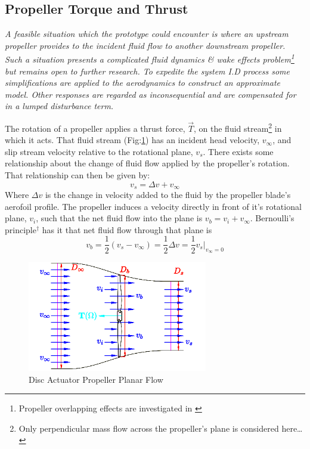 \subsection{Propeller Torque and Thrust}
\label{subsec:dynamics.aero.bem}
\emph{\color{Gray} A feasible situation which the prototype could encounter is where an upstream propeller provides to the incident fluid flow to another downstream propeller. Such a situation presents a complicated fluid dynamics \& wake effects problem\footnote{Propeller overlapping effects are investigated in \cite{configurationpropulsion}} but remains open to further research. To expedite the system I.D process some simplifications are applied to the aerodynamics to construct an approximate model. Other responses are regarded as inconsequential and are compensated for in a lumped disturbance term.}
\par
The rotation of a propeller applies a thrust force, $\vec{T}$, on the fluid stream\footnote{Only perpendicular mass flow across the propeller's plane is considered here\ldots} in which it acts. That fluid stream (Fig:\ref{fig:bem-flow}) has an incident head velocity, $v_\infty$, and slip stream velocity relative to the rotational plane, $v_s$. There exists some relationship about the change of fluid flow applied by the propeller's rotation. That relationship can then be given by:
\begin{equation}
v_ s = \Delta v + v_\infty
\end{equation}
Where $\Delta v$ is the change in velocity added to the fluid by the propeller blade's aerofoil profile. The propeller induces a velocity directly in front of it's rotational plane, $v_i$, such that the net fluid flow into the plane is $v_b=v_i+v_\infty$. Bernoulli's principle$^{\dagger}$ has it that net fluid flow through that plane is
\begin{equation}\label{eq:bernoulli}
v_b = \frac{1}{2} ( v_s - v_{\infty} ) = \frac{1}{2} \Delta v = \frac{1}{2} v_s \big|_{v_\infty=0}
\end{equation}
\begin{figure}[htbp]
\centering
\includegraphics[width=0.7\textwidth]{figs/bem-flow}
\caption{Disc Actuator Propeller Planar Flow}
\label{fig:bem-flow}
\end{figure}
